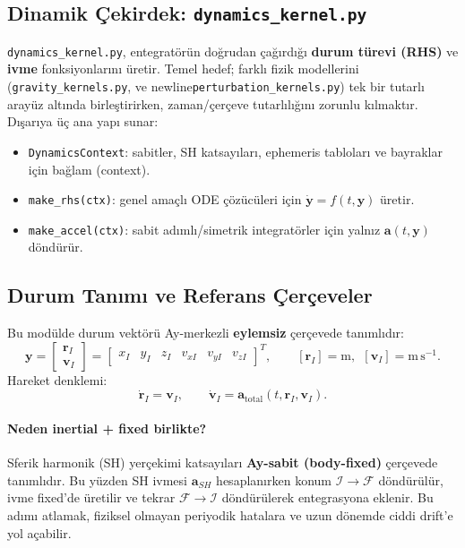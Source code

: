 \newpage
\subsection{Dinamik Çekirdek: \texttt{dynamics\_kernel.py}}
\label{subsec:dynamics_kernel}

\texttt{dynamics\_kernel.py}, entegratörün doğrudan çağırdığı \textbf{durum türevi (RHS)} ve \textbf{ivme} fonksiyonlarını üretir. Temel hedef; farklı fizik modellerini (\texttt{gravity\_kernels.py}, ve  newline\texttt{perturbation\_kernels.py}) tek bir tutarlı arayüz altında birleştirirken, \textbf{}{zaman/çerçeve tutarlılığını} zorunlu kılmaktır. Dışarıya üç ana yapı sunar:

\begin{itemize}
  \item \texttt{DynamicsContext}: sabitler, SH katsayıları, ephemeris tabloları ve bayraklar için bağlam (context).
  \item \texttt{make\_rhs(ctx)}: genel amaçlı ODE çözücüleri için \(\dot{\mathbf{y}}=f(t,\mathbf{y})\) üretir.
  \item \texttt{make\_accel(ctx)}: sabit adımlı/simetrik integratörler için yalnız \(\mathbf{a}(t,\mathbf{y})\) döndürür.
\end{itemize}

\subsection*{Durum Tanımı ve Referans Çerçeveler}
Bu modülde durum vektörü Ay-merkezli \textbf{eylemsiz} çerçevede tanımlıdır:
\begin{equation}
\mathbf{y}=
\begin{bmatrix}
\mathbf{r}_I\\
\mathbf{v}_I
\end{bmatrix}
=
\begin{bmatrix}
x_I & y_I & z_I & v_{xI} & v_{yI} & v_{zI}
\end{bmatrix}^{T},
\qquad
[\mathbf{r}_I]=\mathrm{m},\ \ [\mathbf{v}_I]=\mathrm{m\,s^{-1}}.
\end{equation}
Hareket denklemi:
\begin{equation}
\dot{\mathbf{r}}_I=\mathbf{v}_I,
\qquad
\dot{\mathbf{v}}_I=\mathbf{a}_{\mathrm{total}}(t,\mathbf{r}_I,\mathbf{v}_I).
\label{eq:dyn_ode}
\end{equation}

\paragraph{Neden inertial + fixed birlikte?}
Sferik harmonik (SH) yerçekimi katsayıları \textbf{Ay-sabit (body-fixed)} çerçevede tanımlıdır.
Bu yüzden SH ivmesi \(\mathbf{a}_{SH}\) hesaplanırken konum \(\mathcal{I}\rightarrow\mathcal{F}\) döndürülür,
ivme fixed’de üretilir ve tekrar \(\mathcal{F}\rightarrow\mathcal{I}\) döndürülerek entegrasyona eklenir.
Bu adımı atlamak, fiziksel olmayan periyodik hatalara ve uzun dönemde ciddi drift’e yol açabilir.

